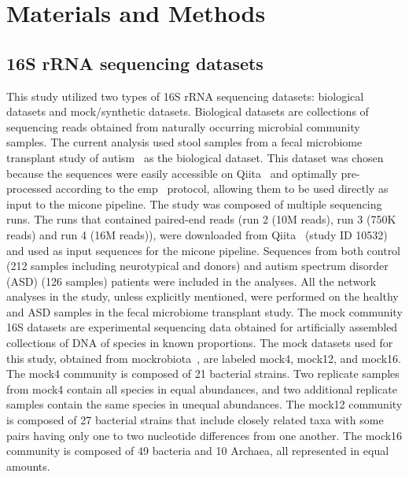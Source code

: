 \documentclass[letterpaper,12pt]{article}
\begin{document}
\section*{Materials and Methods}

  \subsection*{16S rRNA sequencing datasets}
  \vspace{-5mm}
  This study utilized two types of 16S rRNA sequencing datasets: biological datasets and mock/synthetic datasets.
  Biological datasets are collections of sequencing reads obtained from naturally occurring microbial community samples.
  The current analysis used stool samples from a fecal microbiome transplant study of autism~\cite{Kang2017} as the biological dataset.
  This dataset was chosen because the sequences were easily accessible on Qiita~\cite{qiita} and optimally pre-processed according to the \ac{emp}~\cite{Thompson2017} protocol, allowing them to be used directly as input to the \ac{micone} pipeline.
  The study was composed of multiple sequencing runs.
  The runs that contained paired-end reads (run 2 (10M reads), run 3 (750K reads) and run 4 (16M reads)), were downloaded from Qiita~\cite{qiita} (study ID 10532) and used as input sequences for the \ac{micone} pipeline.
  Sequences from both control (212 samples including neurotypical and donors) and autism spectrum disorder (ASD) (126 samples) patients were included in the analyses.
  All the network analyses in the study, unless explicitly mentioned, were performed on the healthy and ASD samples in the fecal microbiome transplant study.
  The mock community 16S datasets are experimental sequencing data obtained for artificially assembled collections of DNA of species in known proportions.
  The mock datasets used for this study, obtained from mockrobiota~\cite{Bokulich2016}, are labeled mock4, mock12, and mock16.
  The mock4 community is composed of 21 bacterial strains.
  Two replicate samples from mock4 contain all species in equal abundances, and two additional replicate samples contain the same species in unequal abundances.
  The mock12 community is composed of 27 bacterial strains that include closely related taxa with some pairs having only one to two nucleotide differences from one another.
  The mock16 community is composed of 49 bacteria and 10 Archaea, all represented in equal amounts.
\end{document}
